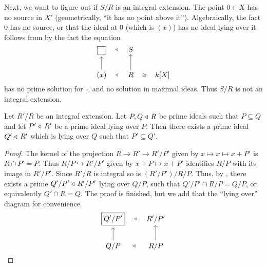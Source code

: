 \documentclass[11pt,a4paper]{article}
\begin{document}
\begin{example}
  Next, we want to figure out if $S/R$ is an integral extension.
  The point $0 \in X$ has no source in $X'$ (geometrically, ``it has no point
  above it'').
  Algebraically, the fact $0$ has no source,
  or that the ideal at $0$ (which is $(x)$) has no ideal lying
  over it follows from  by the fact
  the equation
  \[\begin{tikzcd}[ampersand replacement=\&,cramped]
    \boxed{\phantom{x}} \& S \\
	{(x)} \& R \& {k[X]}
  \arrow["\idealin", shift right=1.5, draw=none, from=1-1, to=1-2]
	\arrow[from=2-1, to=1-1]
  \arrow["\idealin", shift right=1.5, draw=none, from=2-1, to=2-2]
	\arrow[from=2-2, to=1-2]
	\arrow["\cong"{description}, draw=none, from=2-2, to=2-3]
\end{tikzcd}\]
  has no prime solution for $\square$,
  and no solution in maximal ideas.
  Thus $S/R$ is not an integral extension.
\end{example}

\begin{theorem}[Going up]
  \label{thm:going-up}
  Let $R'/R$ be an integral extension.
  Let $P,Q \triangleleft\, R$ be prime ideals such that $P \subseteq Q$
  and let $P' \triangleleft\, R'$ be a prime ideal lying over $P$.
  Then there exists a prime ideal $Q' \triangleleft\, R'$ which is lying over $Q$
  such that $P' \subseteq Q'$.
\end{theorem}
\begin{proof}
  The kernel of the projection $R \to R' \to R'/P'$ given by
  $x \mapsto x \mapsto x + P'$ is $R \cap P' = P$.
  Thus $R/P \hookrightarrow R'/P'$ given by $x + P \mapsto x + P'$
  identifies $R/P$ with its image in $R'/P'$.
  Since $R'/R$ is integral so is $(R'/P')/R/P$.
  Thus, by ,
  there exists a prime $Q'/P' \triangleleft\, R'/P'$ lying over
  $Q/P$, such that $Q'/P' \cap R/P = Q/P$,
  or equivalently $Q' \cap R = Q$.
  The proof is finished, but we add that the ``lying over'' diagram
  for convenience.
  \[\begin{tikzcd}[ampersand replacement=\&,cramped]
	{\boxed{Q'/P'}} \& {R'/P'} \\
	{Q/P} \& {R/P}
	\arrow["\normalin", draw=none, shift right=1.5, from=1-1, to=1-2]
	\arrow[from=2-1, to=1-1]
	\arrow["\normalin", draw=none, shift right=1.5, from=2-1, to=2-2]
	\arrow[from=2-2, to=1-2]
\end{tikzcd}\]
\end{proof}
\end{document}
